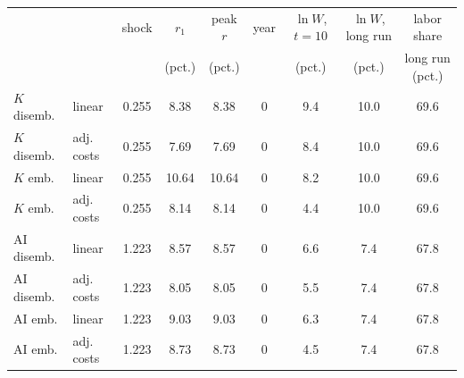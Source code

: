 \begin{tabular}{llccccccc}\toprule
 & & shock & $r_1$ & peak $r$ & year & $\ln W$, $t{=}10$ & $\ln W$, long run & labor share\\
 & & & (pct.) & (pct.) & & (pct.) & (pct.) & long run (pct.)\\\midrule
$K$ disemb. & linear & 0.255 & 8.38 & 8.38 & 0 & 9.4 & 10.0 & 69.6\\
$K$ disemb. & adj. costs & 0.255 & 7.69 & 7.69 & 0 & 8.4 & 10.0 & 69.6\\
$K$ emb. & linear & 0.255 & 10.64 & 10.64 & 0 & 8.2 & 10.0 & 69.6\\
$K$ emb. & adj. costs & 0.255 & 8.14 & 8.14 & 0 & 4.4 & 10.0 & 69.6\\
\midrule
AI disemb. & linear & 1.223 & 8.57 & 8.57 & 0 & 6.6 & 7.4 & 67.8\\
AI disemb. & adj. costs & 1.223 & 8.05 & 8.05 & 0 & 5.5 & 7.4 & 67.8\\
AI emb. & linear & 1.223 & 9.03 & 9.03 & 0 & 6.3 & 7.4 & 67.8\\
AI emb. & adj. costs & 1.223 & 8.73 & 8.73 & 0 & 4.5 & 7.4 & 67.8\\
\bottomrule\end{tabular}
